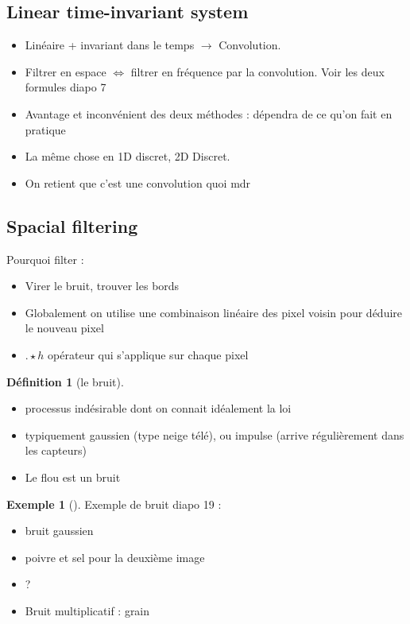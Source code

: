 \documentclass{article}
\theoremstyle{plain}%
\theoremstyle{definition}
\newtheorem{defn}{Définition}[section]
\newtheorem{exmp}{Exemple}[section]
\theoremstyle{remark}
\begin{document}
\subsection{Linear time-invariant system}
\begin{itemize}
    \item Linéaire + invariant dans le temps $\rightarrow$ Convolution.
    \item Filtrer en espace $ \Leftrightarrow $ filtrer en fréquence par la convolution. Voir les deux formules diapo 7
    \item Avantage et inconvénient des deux méthodes : dépendra de ce qu'on fait en pratique 
    \item La même chose en 1D discret, 2D Discret.
    \item On retient que c'est une convolution quoi mdr
\end{itemize}

\subsection{Spacial filtering}
Pourquoi filter : \begin{itemize}
    \item Virer le bruit, trouver les bords 
    \item Globalement on utilise une combinaison linéaire des pixel voisin pour déduire le nouveau pixel
    \item $ . \star h $ opérateur qui s'applique sur chaque pixel
\end{itemize}
\begin{defn}[le bruit]
    \begin{itemize}
        \item processus indésirable dont on connait idéalement la loi
        \item typiquement gaussien (type neige télé), ou impulse (arrive régulièrement dans les capteurs)
        \item Le flou est un bruit
    \end{itemize}
\end{defn}
\begin{exmp}[]
    Exemple de bruit diapo 19 : \begin{itemize}
        \item bruit gaussien
        \item poivre et sel pour la deuxième image 
        \item ?
        \item Bruit multiplicatif : grain
    \end{itemize}
\end{exmp}
\end{document}
